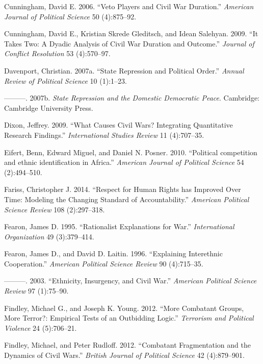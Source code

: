 \documentclass[12pt,]{book}
\theoremstyle{definition}
\theoremstyle{definition}
\theoremstyle{definition}
\theoremstyle{remark}
\begin{document}
\leavevmode\hypertarget{ref-Cunningham2006}{}%
Cunningham, David E. 2006. ``Veto Players and Civil War Duration.''
\emph{American Journal of Political Science} 50 (4):875--92.

\leavevmode\hypertarget{ref-Cunningham2009}{}%
Cunningham, David E., Kristian Skrede Gleditsch, and Idean Salehyan.
2009. ``It Takes Two: A Dyadic Analysis of Civil War Duration and
Outcome.'' \emph{Journal of Conflict Resolution} 53 (4):570--97.

\leavevmode\hypertarget{ref-Davenport2007b}{}%
Davenport, Christian. 2007a. ``State Repression and Political Order.''
\emph{Annual Review of Political Science} 10 (1):1--23.

\leavevmode\hypertarget{ref-Davenport2007a}{}%
---------. 2007b. \emph{State Repression and the Domestic Democratic
Peace}. Cambridge: Cambridge University Press.

\leavevmode\hypertarget{ref-Dixon2009a}{}%
Dixon, Jeffrey. 2009. ``What Causes Civil Wars? Integrating Quantitative
Research Findings.'' \emph{International Studies Review} 11 (4):707--35.

\leavevmode\hypertarget{ref-Eifert2010}{}%
Eifert, Benn, Edward Miguel, and Daniel N. Posner. 2010. ``Political
competition and ethnic identification in Africa.'' \emph{American
Journal of Political Science} 54 (2):494--510.

\leavevmode\hypertarget{ref-Fariss2014}{}%
Fariss, Christopher J. 2014. ``Respect for Human Rights has Improved
Over Time: Modeling the Changing Standard of Accountability.''
\emph{American Political Science Review} 108 (2):297--318.

\leavevmode\hypertarget{ref-fearon95}{}%
Fearon, James D. 1995. ``Rationalist Explanations for War.''
\emph{International Organization} 49 (3):379--414.

\leavevmode\hypertarget{ref-Fearon1996}{}%
Fearon, James D., and David D. Laitin. 1996. ``Explaining Interethnic
Cooperation.'' \emph{American Political Science Review} 90 (4):715--35.

\leavevmode\hypertarget{ref-fearonlaitin03}{}%
---------. 2003. ``Ethnicity, Insurgency, and Civil War.''
\emph{American Political Science Review} 97 (1):75--90.

\leavevmode\hypertarget{ref-Findley2012a}{}%
Findley, Michael G., and Joseph K. Young. 2012. ``More Combatant Groups,
More Terror?: Empirical Tests of an Outbidding Logic.'' \emph{Terrorism
and Political Violence} 24 (5):706--21.

\leavevmode\hypertarget{ref-Findley2012}{}%
Findley, Michael, and Peter Rudloff. 2012. ``Combatant Fragmentation and
the Dynamics of Civil Wars.'' \emph{British Journal of Political
Science} 42 (4):879--901.
\end{document}

